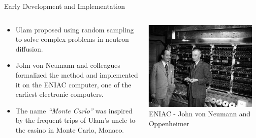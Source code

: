 \documentclass[8pt]{beamer}
\begin{document}
\begin{frame}{Early Development and Implementation}
\begin{columns}
    \begin{column}{0.65\textwidth}
    \begin{itemize}
        \item Ulam proposed using random sampling to solve complex problems in neutron diffusion.
        \item John von Neumann and colleagues formalized the method and implemented it on the ENIAC computer, one of the earliest electronic computers.
        \item The name \textit{“Monte Carlo”} was inspired by the frequent trips of Ulam's uncle to the casino in Monte Carlo, Monaco.
    \end{itemize}
    \end{column}

    \begin{column}{0.35\textwidth}
        \begin{center}
        \includegraphics[width=\textwidth]{oppenheimer-neuman-ecp.jpg} %
        \\[0.5em]
        \footnotesize ENIAC - John von Neumann and Oppenheimer

        \vspace{1em}


\end{center}
\end{column}
\end{columns}
\end{frame}
\end{document}
